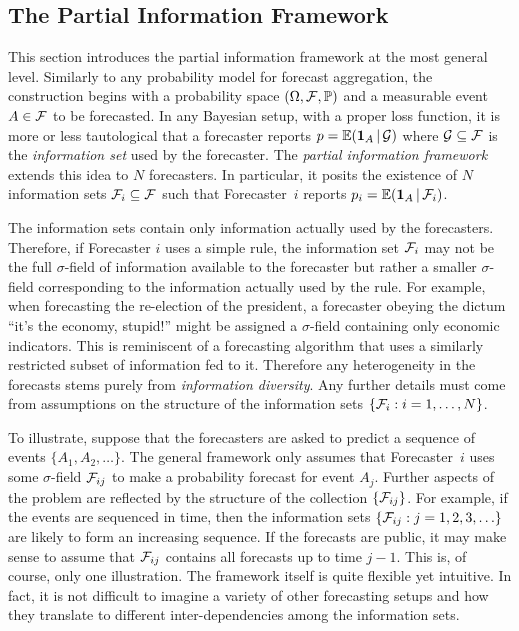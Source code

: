 \documentclass[11pt]{article}
\renewcommand{\P}{\mathbb{P}}
\newcommand{\E}{\mathbb{E}}
\theoremstyle{definition}
\theoremstyle{definition}
\def\one{{\bf 1}}
\def\F{{\cal F}}
\def\G{{\cal G}}
\def\P{{\mathbb P}}
\def\E{{\mathbb E}}
\def\|{\, | \,}
\begin{document}
\subsection{The Partial Information Framework}
\label{PIFintro}
This section introduces the partial information framework at the most general level. Similarly to any probability model for forecast aggregation, the construction begins with
 a probability space $(\Omega, \F , \P)$ and a
measurable event $A \in \F$ to be forecasted.  In any Bayesian setup,
with a proper loss function, it is more or less tautological that a
forecaster reports $p = \E (\one_A \| \G)$ where $\G \subseteq \F$ is
the \textit{information set} used by the forecaster.  The
\textit{partial information framework} extends this idea to $N$
forecasters. In particular, it posits the existence of $N$
information sets $\F_i \subseteq \F$ such that Forecaster~$i$
reports $p_i = \E (\one_A \| \F_i)$.

The information sets contain only information actually used by the
forecasters. Therefore, if Forecaster $i$ uses a simple rule, the
information set $\F_i$ may not be the full $\sigma$-field of
information available to the forecaster but rather a smaller
$\sigma$-field corresponding to the information actually used by the
rule.  For example, when forecasting the re-election of the president,  a forecaster obeying the dictum ``it's the economy,
stupid!''  might be assigned a $\sigma$-field containing only economic
indicators.  This is reminiscent of a forecasting algorithm that uses
a similarly restricted subset of information fed to it. Therefore
any heterogeneity in the forecasts stems purely from
\textit{information diversity}.  Any further details must come from
assumptions on the structure of the information sets $\{ \F_i : i = 1,
\dots, N\}$.  %

To illustrate, suppose that the forecasters are asked to predict a sequence of events
$\{ A_1, A_2 , \ldots \}$. The general framework only assumes that
Forecaster~$i$ uses some $\sigma$-field $\F_{ij}$ to make a
probability forecast for event $A_j$.  Further aspects of the problem
are reflected by the structure of the collection $\{ \F_{ij} \}$.  For
example, if the events are sequenced in time, then the information
sets $\{ \F_{ij} : j = 1 , 2, 3, \ldots \}$ are likely to form an
increasing sequence.  If the forecasts are public, it may make sense
to assume that $\F_{ij}$ contains all forecasts up to time $j-1$.
This is, of course, only one illustration. The framework itself is quite flexible
yet intuitive. In fact, it is not difficult to imagine a variety
of other forecasting setups and how they translate to
different inter-dependencies among the information sets.
\end{document}
